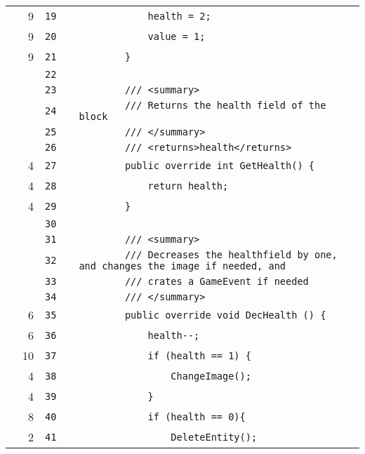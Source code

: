 \documentclass[a4paper,landscape,10pt]{article}
\begin{document}
\begin{longtable}[l]{lrrll}
\cellcolor{green} & 9 & \verb~19~ & & \verb~            health = 2;~\\
\cellcolor{green} & 9 & \verb~20~ & & \verb~            value = 1;~\\
\cellcolor{green} & 9 & \verb~21~ & & \verb~        }~\\
\cellcolor{gray} &  & \verb~22~ & & \verb~~\\
\cellcolor{gray} &  & \verb~23~ & & \verb~        /// <summary>~\\
\cellcolor{gray} &  & \verb~24~ & & \verb~        /// Returns the health field of the block~\\
\cellcolor{gray} &  & \verb~25~ & & \verb~        /// </summary>~\\
\cellcolor{gray} &  & \verb~26~ & & \verb~        /// <returns>health</returns>~\\
\cellcolor{green} & 4 & \verb~27~ & & \verb~        public override int GetHealth() {~\\
\cellcolor{green} & 4 & \verb~28~ & & \verb~            return health;~\\
\cellcolor{green} & 4 & \verb~29~ & & \verb~        }~\\
\cellcolor{gray} &  & \verb~30~ & & \verb~~\\
\cellcolor{gray} &  & \verb~31~ & & \verb~        /// <summary>~\\
\cellcolor{gray} &  & \verb~32~ & & \verb~        /// Decreases the healthfield by one, and changes the image if needed, and~\\
\cellcolor{gray} &  & \verb~33~ & & \verb~        /// crates a GameEvent if needed~\\
\cellcolor{gray} &  & \verb~34~ & & \verb~        /// </summary>~\\
\cellcolor{green} & 6 & \verb~35~ & & \verb~        public override void DecHealth () {~\\
\cellcolor{green} & 6 & \verb~36~ & & \verb~            health--;~\\
\cellcolor{green} & 10 & \verb~37~ & & \verb~            if (health == 1) {~\\
\cellcolor{green} & 4 & \verb~38~ & & \verb~                ChangeImage();~\\
\cellcolor{green} & 4 & \verb~39~ & & \verb~            }~\\
\cellcolor{green} & 8 & \verb~40~ & & \verb~            if (health == 0){~\\
\cellcolor{green} & 2 & \verb~41~ & & \verb~                DeleteEntity();~\\

\end{longtable}
\end{document}
